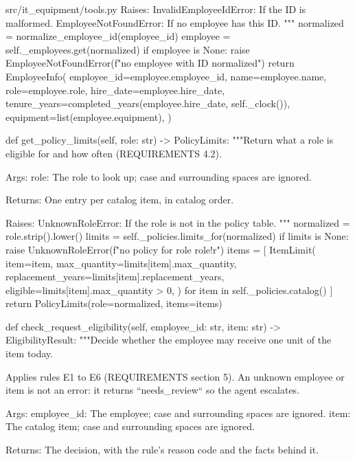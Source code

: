 \documentclass[11pt,letterpaper]{article}
\renewcommand{\_}{\textunderscore\allowbreak}
\begin{document}
\begin{codebox}{src/it_equipment/tools.py}
        Raises:
            InvalidEmployeeIdError: If the ID is malformed.
            EmployeeNotFoundError: If no employee has this ID.
        """
        normalized = normalize_employee_id(employee_id)
        employee = self._employees.get(normalized)
        if employee is None:
            raise EmployeeNotFoundError(f"no employee with ID {normalized}")
        return EmployeeInfo(
            employee_id=employee.employee_id,
            name=employee.name,
            role=employee.role,
            hire_date=employee.hire_date,
            tenure_years=completed_years(employee.hire_date, self._clock()),
            equipment=list(employee.equipment),
        )

    def get_policy_limits(self, role: str) -> PolicyLimits:
        """Return what a role is eligible for and how often (REQUIREMENTS 4.2).

        Args:
            role: The role to look up; case and surrounding spaces are ignored.

        Returns:
            One entry per catalog item, in catalog order.

        Raises:
            UnknownRoleError: If the role is not in the policy table.
        """
        normalized = role.strip().lower()
        limits = self._policies.limits_for(normalized)
        if limits is None:
            raise UnknownRoleError(f"no policy for role {role!r}")
        items = [
            ItemLimit(
                item=item,
                max_quantity=limits[item].max_quantity,
                replacement_years=limits[item].replacement_years,
                eligible=limits[item].max_quantity > 0,
            )
            for item in self._policies.catalog()
        ]
        return PolicyLimits(role=normalized, items=items)

    def check_request_eligibility(self, employee_id: str, item: str) -> EligibilityResult:
        """Decide whether the employee may receive one unit of the item today.

        Applies rules E1 to E6 (REQUIREMENTS section 5). An unknown employee or item is not
        an error: it returns ``needs_review`` so the agent escalates.

        Args:
            employee_id: The employee; case and surrounding spaces are ignored.
            item: The catalog item; case and surrounding spaces are ignored.

        Returns:
            The decision, with the rule's reason code and the facts behind it.


\end{codebox}
\end{document}
